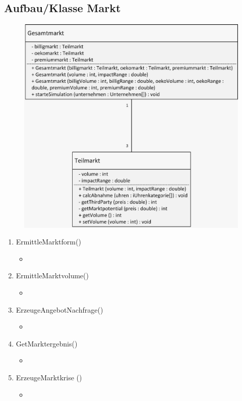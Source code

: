 \subsection{Aufbau/Klasse Markt}
\begin{figure} [!h]
	\centering
	\includegraphics[scale=0.3]{img/Markt.png} 
\end{figure}
\clearpage
\begin{enumerate}
	\item ErmittleMarktform() 
	\begin{itemize}
	\item	
	\end{itemize}
	\item ErmittleMarktvolume() 
	\begin{itemize}
	\item 	
	\end{itemize}
	\item ErzeugeAngebotNachfrage() 
	\begin{itemize}
	\item 	
	\end{itemize}
	\item GetMarktergebnis() 
	\begin{itemize}
	\item 	
	\end{itemize}
	\item ErzeugeMarktkrise () 
	\begin{itemize}
	\item 	
	\end{itemize}
\end{enumerate}




